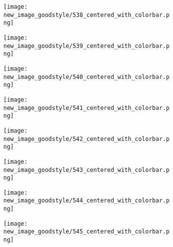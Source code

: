 \documentclass[a4paper,12pt]{article}
\begin{document}
\begin{figure}[H]
  \begin{subfigure}{0.11\textwidth}
    \texttt{[image: new\_image\_goodstyle/538\_centered\_with\_colorbar.png]}
  \end{subfigure}
  \hfill
  \begin{subfigure}{0.11\textwidth}
    \texttt{[image: new\_image\_goodstyle/539\_centered\_with\_colorbar.png]}
  \end{subfigure}
  \hfill
  \begin{subfigure}{0.11\textwidth}
    \texttt{[image: new\_image\_goodstyle/540\_centered\_with\_colorbar.png]}
  \end{subfigure}
  \hfill
  \begin{subfigure}{0.11\textwidth}
    \texttt{[image: new\_image\_goodstyle/541\_centered\_with\_colorbar.png]}
  \end{subfigure}
  \hfill
  \begin{subfigure}{0.11\textwidth}
    \texttt{[image: new\_image\_goodstyle/542\_centered\_with\_colorbar.png]}
  \end{subfigure}
  \hfill
  \begin{subfigure}{0.11\textwidth}
    \texttt{[image: new\_image\_goodstyle/543\_centered\_with\_colorbar.png]}
  \end{subfigure}
  \hfill
  \begin{subfigure}{0.11\textwidth}
    \texttt{[image: new\_image\_goodstyle/544\_centered\_with\_colorbar.png]}
  \end{subfigure}
  \hfill
  \begin{subfigure}{0.11\textwidth}
    \texttt{[image: new\_image\_goodstyle/545\_centered\_with\_colorbar.png]}
  \end{subfigure}
  \hfill
\end{figure}
\end{document}
